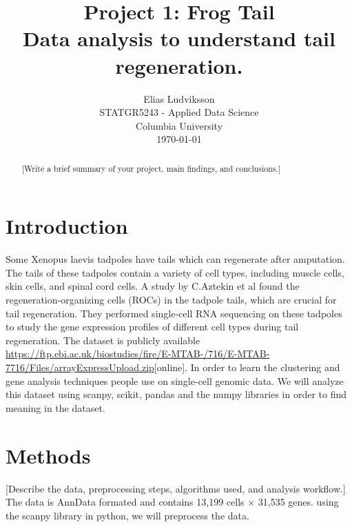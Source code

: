 \documentclass[12pt,letterpaper]{article}
\title{
	\vspace{2cm}
	\textbf{Project 1: Frog Tail}\\
	\vspace{0.5cm}
	\large Data analysis to understand tail regeneration.\\
	\vspace{1cm}
}
\author{
	Elias Ludviksson \\
	STATGR5243 - Applied Data Science \\
	Columbia University \\
	\vspace{0.5cm}
	\today
}
\date{}
\begin{document}
\maketitle
\newpage
\begin{abstract}
	[Write a brief summary of your project, main findings, and conclusions.]
\end{abstract}
\newpage
\setcounter{page}{1}
\tableofcontents
\newpage

\section{Introduction}

Some Xenopus laevis tadpoles have tails which can regenerate after amputation. The tails of these tadpoles contain a variety of cell types, including muscle cells, skin cells, and spinal cord cells.
A study by C.Aztekin et al found the regeneration-organizing cells (ROCs) in the tadpole tails, which are crucial for tail regeneration. They performed single-cell RNA sequencing on these tadpoles to study the gene expression profiles of different cell types during tail regeneration.
The dataset is publicly available \url{https://ftp.ebi.ac.uk/biostudies/fire/E-MTAB-/716/E-MTAB-7716/Files/arrayExpressUpload.zip}[online]. In order to learn the clustering and gene analysis techniques people use on single-cell genomic data. 
We will analyze this dataset using scanpy, scikit, pandas and the numpy libraries in order to find meaning in the dataset.

\section{Methods}
[Describe the data, preprocessing steps, algorithms used, and analysis workflow.]
The data is AnnData formated and contains 13,199 cells × 31,535 genes. using the scanpy
library in python, we will preprocess the data.
\end{document}
